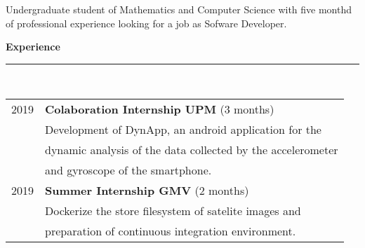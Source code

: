 \documentclass{article}
\begin{document}
\hspace{0.25cm}\vline\hspace{0.25cm}
\begin{minipage}[c]{0.66\linewidth}
  \setlength{\parskip}{0.3em}

  \begin{center}
    \Large Undergraduate student of Mathematics and Computer Science with five monthd of professional experience looking for a job as Sofware Developer.
  \end{center}

  \textbf{\Large{\color{BlueViolet}Experience}}\\[-0.25cm]
  {\color{BlueViolet} \rule{\linewidth}{0.1mm} }\\[-0.25cm]
  \begin{tabular}{l l}
    2019 & \textbf{Colaboration Internship UPM} (3 months)\\
         & Development of DynApp, an android application for the \\
         & dynamic analysis of the data collected by the accelerometer \\ 
         & and gyroscope of the smartphone. \\[0.3cm]
    2019 & \textbf{Summer Internship GMV} (2 months)\\
         & Dockerize the store filesystem of satelite images  and \\
         & preparation of continuous integration environment. \\
  \end{tabular}
  \vspace{0.3cm}
  

\end{minipage}
\end{document}
